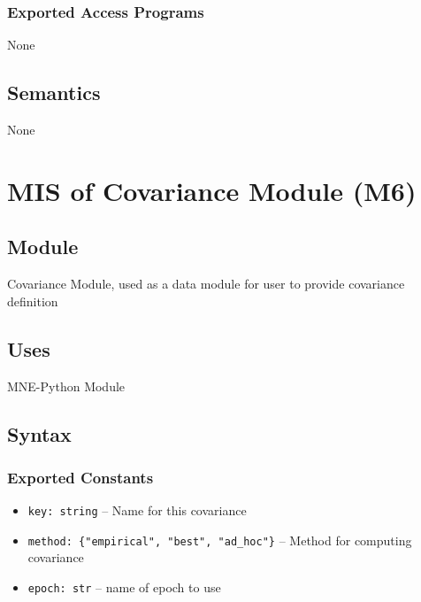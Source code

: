 \documentclass[12pt, titlepage]{article}
\begin{document}
\subsubsection{Exported Access Programs}


None




\subsection{Semantics}


None


\newpage








\section{MIS of Covariance Module (M6)}




\subsection{Module}


Covariance Module, used as a data module for user to provide covariance definition




\subsection{Uses}


MNE-Python Module




\subsection{Syntax}


\subsubsection{Exported Constants}


\begin{itemize}
    \item \lstinline|key: string| -- Name for this covariance
    \item \lstinline|method: {"empirical", "best", "ad_hoc"}| -- Method for computing covariance
    \item \lstinline|epoch: str| -- name of epoch to use
\end{itemize}
\end{document}
